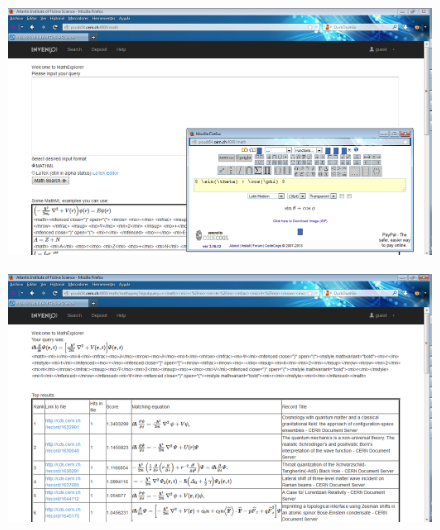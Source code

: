 \documentclass{sig-alternate}
\begin{document}
%

\begin{figure}
\centering
\begin{minipage}{.27\textwidth}
  \includegraphics[width=0.9\linewidth]{images/figures/input_interface.png}
  \label{fig:test1}
\end{minipage}%
\begin{minipage}{.27\textwidth}
  \includegraphics[width=0.9\linewidth]{images/figures/results_interface.png}
  \label{fig:test2}
\end{minipage}
\end{figure}
\end{document}
